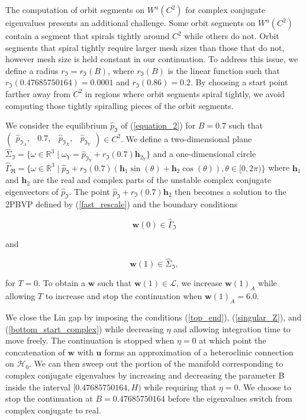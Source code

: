 \documentclass{ws-ijbc}
\begin{document}
The computation of orbit segments on $W^u(C^2)$ for complex conjugate eigenvalues presents an additional challenge.  Some orbit segments on $W^u(C^2)$ contain a segment that spirals tightly around $C^2$ while others do not.  Orbit segments that spiral tightly require larger mesh sizes than those that do not, however mesh size is held constant in our continuation.  To address this issue, we define a radius $r_{\Im} =  r_{\Im}(B)$, where $r_{\Im}(B)$ is the linear function such that $r_{\Im}(0.47685750164)=0.0001$ and $r_{\Im}(0.86)=0.2$.  By choosing a start point farther away from $C^2$ in regions where orbit segments spiral tightly, we avoid computing those tightly spiralling pieces of the orbit segments.

We consider the equilibrium $\hat{p}_{\Im}$ of (\ref{equation_2}) for $B=0.7$ such that $\begin{pmatrix} \hat{p}_{\Im_A},& 0.7,&\hat{p}_{\Im_X},&\hat{p}_{\Im_Y} \end{pmatrix} \in C^2$.  We define a two-dimensional plane $\widehat{\Sigma}_{\Im} = \{ \omega \in \mathbb{R}^3  \; | \; \omega_Y = \hat{p}_{\Im_Y} + r_{\Im}(0.7) \mathbf{h}_{2_Y} \}$ and a one-dimensional circle $\widehat{\Gamma}_{\Re}= \{ \omega \in \mathbb{R}^3  \; | \; \hat{p}_{\Im} + r_{\Im}(0.7)(\mathbf{h}_1\sin(\theta) + \mathbf{h}_2\cos(\theta)), \theta \in [0,2\pi) \}$  where $\mathbf{h}_1$ and $\mathbf{h}_2$ are the real and complex parts of the unstable complex conjugate eigenvectors of $\hat{p}_{\Im}$.  The point $\hat{p}_{\Im} + r_{\Im}(0.7)\mathbf{h}_2$ then becomes a solution to the 2PBVP defined by (\ref{fast_rescale}) and the boundary conditions

\begin{equation}
	\mathbf{w}(0) \in \widehat{\Gamma}_{\Im}
	\label{bottom_start_complex}
\end{equation}

and

\begin{equation}
	\mathbf{w}(1) \in \widehat{\Sigma}_{\Im},
\end{equation}

\noindent
for $T=0$.  To obtain a $\mathbf{w}$ such that $\mathbf{w}(1) \in \mathscr{L}$, we increase $\mathbf{w}(1)_A$ while allowing $T$ to increase and stop the continuation when $\mathbf{w}(1)_A=6.0$.

We close the Lin gap by imposing the conditions (\ref{top_end}), (\ref{singular_Z}), and (\ref{bottom_start_complex}) while decreasing $\eta$ and allowing integration time to move freely.  The continuation is stopped when $\eta=0$ at which point the concatenation of $\mathbf{w}$ with $\mathbf{u}$ forms an approximation of a heteroclinic connection on $\mathscr{H}_0$.  We can then sweep out the portion of the manifold corresponding to complex conjugate eigenvalues by increasing and decreasing the parameter B inside the interval $[0.47685750164, H)$ while requiring that $\eta=0$.  We choose to stop the continuation at $B=0.47685750164$ before the eigenvalues switch from complex conjugate to real.
\end{document}
